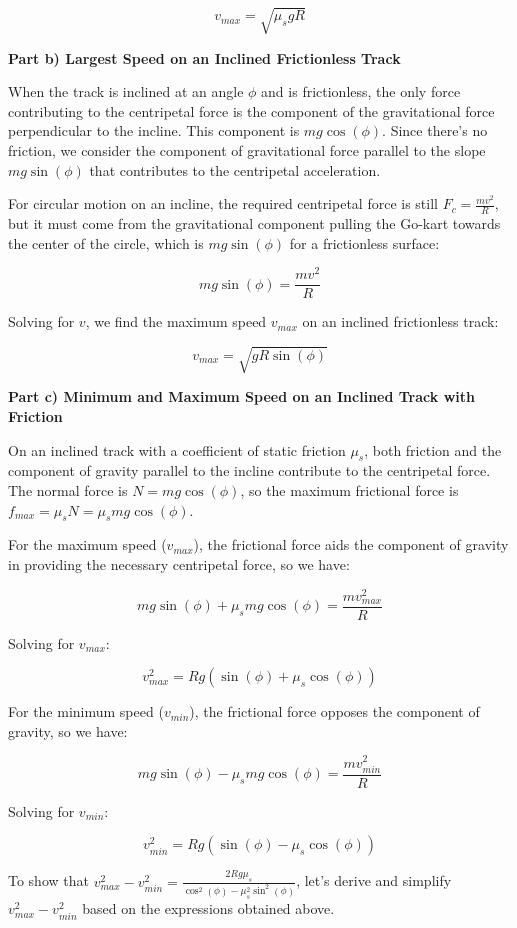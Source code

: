 \[
v_{max} = \sqrt{\mu_{s} g R}
\]

\textbf{Part b) Largest Speed on an Inclined Frictionless Track}

When the track is inclined at an angle \(\phi\) and is frictionless, the only force contributing to the centripetal force is the component of the gravitational force perpendicular to the incline. This component is \(mg \cos(\phi)\). Since there's no friction, we consider the component of gravitational force parallel to the slope \(mg \sin(\phi)\) that contributes to the centripetal acceleration.

For circular motion on an incline, the required centripetal force is still \(F_{c} = \frac{m v^2}{R}\), but it must come from the gravitational component pulling the Go-kart towards the center of the circle, which is \(mg \sin(\phi)\) for a frictionless surface:

\[
mg \sin(\phi) = \frac{m v^2}{R}
\]

Solving for \(v\), we find the maximum speed \(v_{max}\) on an inclined frictionless track:

\[
v_{max} = \sqrt{g R \sin(\phi)}
\]

\textbf{Part c) Minimum and Maximum Speed on an Inclined Track with Friction}

On an inclined track with a coefficient of static friction \(\mu_{s}\), both friction and the component of gravity parallel to the incline contribute to the centripetal force. The normal force is \(N = mg \cos(\phi)\), so the maximum frictional force is \(f_{max} = \mu_{s} N = \mu_{s} mg \cos(\phi)\).

For the maximum speed (\(v_{max}\)), the frictional force aids the component of gravity in providing the necessary centripetal force, so we have:

\[
mg \sin(\phi) + \mu_{s} mg \cos(\phi) = \frac{m v_{max}^2}{R}
\]

Solving for \(v_{max}\):

\[
v_{max}^2 = Rg(\sin(\phi) + \mu_{s} \cos(\phi))
\]

For the minimum speed (\(v_{min}\)), the frictional force opposes the component of gravity, so we have:

\[
mg \sin(\phi) - \mu_{s} mg \cos(\phi) = \frac{m v_{min}^2}{R}
\]

Solving for \(v_{min}\):

\[
v_{min}^2 = Rg(\sin(\phi) - \mu_{s} \cos(\phi))
\]

To show that \(v_{max}^{2} - v_{min}^{2} = \frac{2Rg\mu_{s}}{\cos^{2}(\phi) - \mu_{s}^{2}\sin^{2}(\phi)}\), let's derive and simplify \(v_{max}^{2} - v_{min}^{2}\) based on the expressions obtained above.

